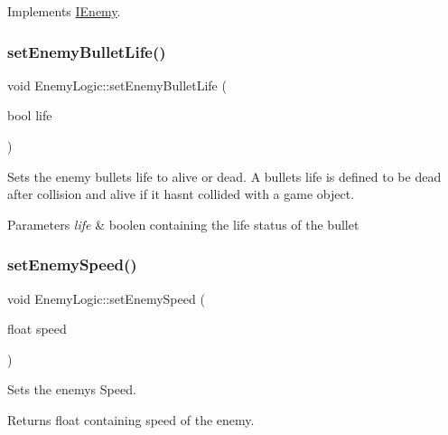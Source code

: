 Implements \hyperlink{class_i_enemy}{I\+Enemy}.

\mbox{\label{class_enemy_logic_a88584f95e49bfd6b174b9b1d9a274cc5}} 
\subsubsection{\texorpdfstring{set\+Enemy\+Bullet\+Life()}{setEnemyBulletLife()}}
{\footnotesize\ttfamily void Enemy\+Logic\+::set\+Enemy\+Bullet\+Life (\begin{DoxyParamCaption}\item[{bool}]{life }\end{DoxyParamCaption})}



Sets the enemy bullets life to alive or dead. A bullets life is defined to be dead after collision and alive if it hasnt collided with a game object. 


\begin{DoxyParams}{Parameters}
{\em life} & boolen containing the life status of the bullet \\
\hline
\end{DoxyParams}
\mbox{\label{class_enemy_logic_aae66ecc1d28feaef7c814a0dff7eed95}} 
\subsubsection{\texorpdfstring{set\+Enemy\+Speed()}{setEnemySpeed()}}
{\footnotesize\ttfamily void Enemy\+Logic\+::set\+Enemy\+Speed (\begin{DoxyParamCaption}\item[{float}]{speed }\end{DoxyParamCaption})}



Sets the enemy\textquotesingle{}s Speed. 

\begin{DoxyReturn}{Returns}
float containing speed of the enemy. 
\end{DoxyReturn}
\mbox{\label{class_enemy_logic_a12bce0a6b6cad1af96aee3b401ea2c45}} 

